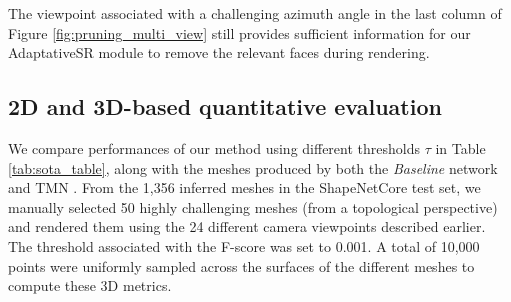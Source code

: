 The viewpoint associated with a challenging azimuth angle in the last column of Figure \ref{fig:pruning_multi_view} still provides sufficient information for our AdaptativeSR module to remove the relevant faces during rendering.

\subsection{2D and 3D-based quantitative evaluation} 

We compare performances of our method using different thresholds $\tau$ in Table \ref{tab:sota_table}, along with the meshes produced by both the \textit{Baseline} network and TMN \citep{pan2019deep}. From the 1,356 inferred meshes in the ShapeNetCore\citep{chang2015shapenet} test set, we manually selected 50 highly challenging meshes (from a topological perspective) and rendered them using the 24 different camera viewpoints described earlier. The threshold associated with the F-score was set to 0.001. A total of 10,000 points were uniformly sampled across the surfaces of the different meshes to compute these 3D metrics. 

